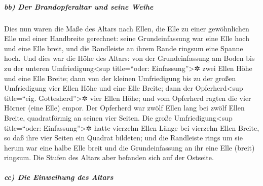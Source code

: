 \hypertarget{bb-der-brandopferaltar-und-seine-weihe}{%
\subparagraph{bb) Der Brandopferaltar und seine
Weihe}\label{bb-der-brandopferaltar-und-seine-weihe}}

Dies nun waren die Maße des Altars nach Ellen, die Elle
zu einer gewöhnlichen Elle und einer Handbreite gerechnet: seine
Grundeinfassung war eine Elle hoch und eine Elle breit, und die
Randleiste an ihrem Rande ringsum eine Spanne hoch. Und dies war die
Höhe des Altars: von der Grundeinfassung am Boden bis zu
der unteren Umfriedigung\textless sup title=``oder:
Einfassung''\textgreater✲ zwei Ellen Höhe und eine Elle Breite; dann von
der kleinen Umfriedigung bis zu der großen Umfriedigung vier Ellen Höhe
und eine Elle Breite; dann der Opferherd\textless sup
title=``eig. Gottesherd''\textgreater✲ vier Ellen Höhe; und vom
Opferherd ragten die vier Hörner (eine Elle) empor. Der
Opferherd war zwölf Ellen lang bei zwölf Ellen Breite, quadratförmig an
seinen vier Seiten. Die große Umfriedigung\textless sup
title=``oder: Einfassung''\textgreater✲ hatte vierzehn Ellen Länge bei
vierzehn Ellen Breite, so daß ihre vier Seiten ein Quadrat bildeten; und
die Randleiste rings um sie herum war eine halbe Elle breit und die
Grundeinfassung an ihr eine Elle (breit) ringsum. Die Stufen des Altars
aber befanden sich auf der Ostseite.

\hypertarget{cc-die-einweihung-des-altars}{%
\subparagraph{cc) Die Einweihung des
Altars}\label{cc-die-einweihung-des-altars}}

